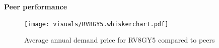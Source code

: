 \documentclass[11pt]{article}
\begin{document}
\vspace{3ex}
\textbf{\Large Peer performance}
\vspace{1ex}

\lipsum[1][1-7]

\begin{figure}[!h]
\centering
\texttt{[image: visuals/RV8GY5.whiskerchart.pdf]}
\caption{Average annual demand price for RV8GY5 compared to peers}
\label{fig:PeerCompDmnd}
\end{figure}
\end{document}
